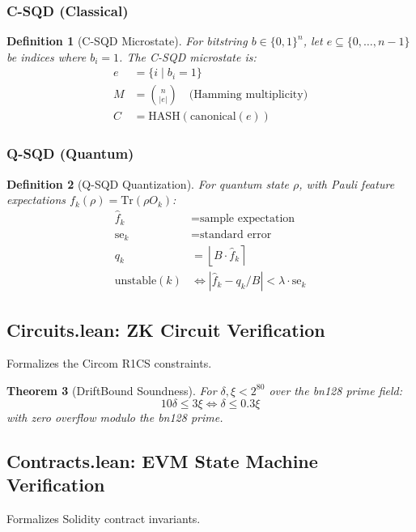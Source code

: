 \documentclass[11pt,a4paper]{article}
\newtheorem{theorem}{Theorem}[section]
\newtheorem{definition}[theorem]{Definition}
\begin{document}
\subsubsection{C-SQD (Classical)}
\begin{definition}[C-SQD Microstate]
For bitstring $b \in \{0,1\}^n$, let $e \subseteq \{0,\ldots,n-1\}$ be indices where $b_i = 1$. The C-SQD microstate is:
\begin{align}
    e &= \{i \mid b_i = 1\} \\
    M &= \binom{n}{|e|} \quad \text{(Hamming multiplicity)} \\
    C &= \text{HASH}(\text{canonical}(e))
\end{align}
\end{definition}

\subsubsection{Q-SQD (Quantum)}
\begin{definition}[Q-SQD Quantization]
For quantum state $\rho$, with Pauli feature expectations $f_k(\rho) = \text{Tr}(\rho O_k)$:
\begin{align}
    \hat{f}_k &= \text{sample expectation} \\
    \text{se}_k &= \text{standard error} \\
    q_k &= \left\lfloor B \cdot \hat{f}_k \right\rceil \\
    \text{unstable}(k) &\iff |\hat{f}_k - q_k/B| < \lambda \cdot \text{se}_k
\end{align}
\end{definition}

\subsection{Circuits.lean: ZK Circuit Verification}
Formalizes the Circom R1CS constraints.

\begin{theorem}[DriftBound Soundness]
For $\delta, \xi < 2^{80}$ over the bn128 prime field:
\[
10\delta \leq 3\xi \iff \delta \leq 0.3\xi
\]
with zero overflow modulo the bn128 prime.
\end{theorem}

\subsection{Contracts.lean: EVM State Machine Verification}
Formalizes Solidity contract invariants.
\end{document}
